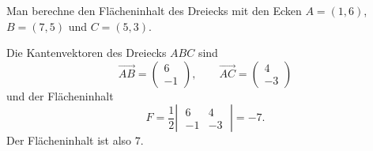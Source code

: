 \begin{beispiel}
Man berechne den Flächeninhalt des Dreiecks mit den Ecken
$A=(1,6)$, $B=(7,5)$ und $C=(5,3)$.

\smallskip

{\parindent 0pt Die Kantenvektoren} des Dreiecks $ABC$ sind
\[
\overrightarrow{AB}=\begin{pmatrix}6\\-1\end{pmatrix}
,\qquad
\overrightarrow{AC}=\begin{pmatrix}4\\-3\end{pmatrix}
\]
und der Flächeninhalt
\[
F=\frac12\left|\;\begin{matrix}
   6&  4\\
  -1& -3
\end{matrix}\;\right|=
-7
.
\]
Der Flächeninhalt ist also $7$.
\end{beispiel}

